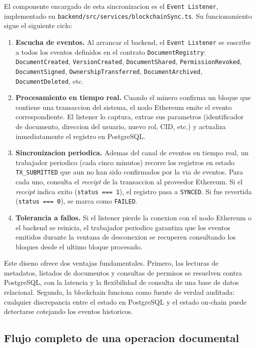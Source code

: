 \documentclass[11pt, a4paper]{article}
\begin{document}
El componente encargado de esta sincronizacion es el \texttt{Event Listener}, implementado en \texttt{backend/src/services/blockchainSync.ts}. Su funcionamiento sigue el siguiente ciclo:

\begin{enumerate}
    \item \textbf{Escucha de eventos.} Al arrancar el backend, el \texttt{Event Listener} se suscribe a todos los eventos definidos en el contrato \texttt{DocumentRegistry}: \texttt{DocumentCreated}, \texttt{VersionCreated}, \texttt{DocumentShared}, \texttt{PermissionRevoked}, \texttt{DocumentSigned}, \texttt{OwnershipTransferred}, \texttt{DocumentArchived}, \texttt{DocumentDeleted}, etc.
    \item \textbf{Procesamiento en tiempo real.} Cuando el minero confirma un bloque que contiene una transaccion del sistema, el nodo Ethereum emite el evento correspondiente. El listener lo captura, extrae sus parametros (identificador de documento, direccion del usuario, nuevo rol, CID, etc.) y actualiza inmediatamente el registro en PostgreSQL.
    \item \textbf{Sincronizacion periodica.} Ademas del canal de eventos en tiempo real, un trabajador periodico (cada cinco minutos) recorre los registros en estado \texttt{TX\_SUBMITTED} que aun no han sido confirmados por la via de eventos. Para cada uno, consulta el \textit{receipt} de la transaccion al proveedor Ethereum. Si el \textit{receipt} indica exito (\texttt{status === 1}), el registro pasa a \texttt{SYNCED}. Si fue revertida (\texttt{status === 0}), se marca como \texttt{FAILED}.
    \item \textbf{Tolerancia a fallos.} Si el listener pierde la conexion con el nodo Ethereum o el backend se reinicia, el trabajador periodico garantiza que los eventos emitidos durante la ventana de desconexion se recuperen consultando los bloques desde el ultimo bloque procesado.
\end{enumerate}

Este diseno ofrece dos ventajas fundamentales. Primero, las lecturas de metadatos, listados de documentos y consultas de permisos se resuelven contra PostgreSQL, con la latencia y la flexibilidad de consulta de una base de datos relacional. Segundo, la blockchain funciona como fuente de verdad auditada: cualquier discrepancia entre el estado en PostgreSQL y el estado on-chain puede detectarse cotejando los eventos historicos.

\subsection{Flujo completo de una operacion documental}
\end{document}
